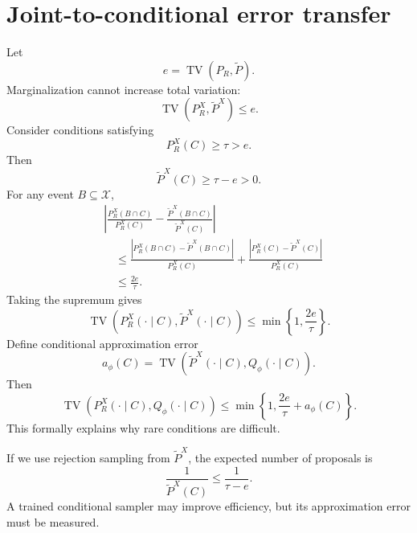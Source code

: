 \documentclass[11pt,a4paper]{article}
\begin{document}
\section{Joint-to-conditional error transfer}
Let
\[
e=\operatorname{TV}(P_R,\widetilde P).
\]
Marginalization cannot increase total variation:
\[
\operatorname{TV}(P_R^X,\widetilde P^X)\leq e.
\]
Consider conditions satisfying
\[
P_R^X(C)\geq\tau>e.
\]
Then
\[
\widetilde P^X(C)\geq\tau-e>0.
\]
For any event $B\subseteq\mathcal X$,
\[
\begin{aligned}
&\left|\frac{P_R^X(B\cap C)}{P_R^X(C)}-
\frac{\widetilde P^X(B\cap C)}{\widetilde P^X(C)}\right|\\
&\quad\leq
\frac{|P_R^X(B\cap C)-\widetilde P^X(B\cap C)|}{P_R^X(C)}
+\frac{|P_R^X(C)-\widetilde P^X(C)|}{P_R^X(C)}\\
&\quad\leq\frac{2e}{\tau}.
\end{aligned}
\]
Taking the supremum gives
\[
\boxed{\operatorname{TV}\left(P_R^X(\cdot\mid C),\widetilde P^X(\cdot\mid C)\right)
\leq\min\left\{1,\frac{2e}{\tau}\right\}.}
\]
Define conditional approximation error
\[
a_\phi(C)=\operatorname{TV}\left(\widetilde P^X(\cdot\mid C),Q_\phi(\cdot\mid C)\right).
\]
Then
\[
\boxed{\operatorname{TV}\left(P_R^X(\cdot\mid C),Q_\phi(\cdot\mid C)\right)
\leq\min\left\{1,\frac{2e}{\tau}+a_\phi(C)\right\}.}
\]
This formally explains why rare conditions are difficult.

If we use rejection sampling from $\widetilde P^X$, the expected number of proposals is
\[
\frac1{\widetilde P^X(C)}\leq\frac1{\tau-e}.
\]
A trained conditional sampler may improve efficiency, but its approximation error must be measured.
\end{document}

